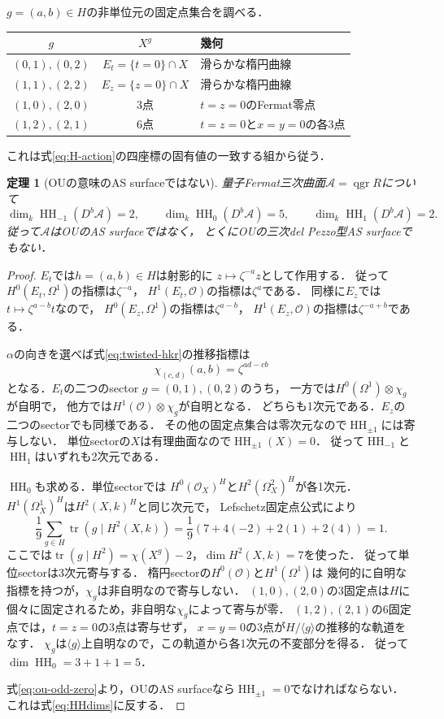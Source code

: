 \documentclass[11pt,a4paper]{ltjsarticle}
\newtheorem{theorem}{定理}[section]
\theoremstyle{definition}
\newcommand{\qgr}{\operatorname{qgr}}
\newcommand{\HH}{\operatorname{HH}}
\newcommand{\tr}{\operatorname{tr}}
\begin{document}
$g=(a,b)\in H$の非単位元の固定点集合を調べる．
\begin{center}\small
\begin{tabular}{ccl}
\toprule
$g$&$X^g$&幾何\\\midrule
$(0,1),(0,2)$&$E_t=\{t=0\}\cap X$&滑らかな楕円曲線\\
$(1,1),(2,2)$&$E_z=\{z=0\}\cap X$&滑らかな楕円曲線\\
$(1,0),(2,0)$&3点&$t=z=0$のFermat零点\\
$(1,2),(2,1)$&6点&$t=z=0$と$x=y=0$の各3点\\\bottomrule
\end{tabular}
\end{center}
これは式\eqref{eq:H-action}の四座標の固有値の一致する組から従う．

\begin{theorem}[OUの意味のAS surfaceではない]
\label{thm:not-OU-AS}
量子Fermat三次曲面$\mathcal A=\qgr R$について
\begin{equation}\label{eq:HHdims}
 \boxed{\dim_k\HH_{-1}(D^b\mathcal A)=2,\qquad
 \dim_k\HH_0(D^b\mathcal A)=5,\qquad
 \dim_k\HH_1(D^b\mathcal A)=2.}
\end{equation}
従って$\mathcal A$はOU\cite[Definition~1.1]{OU}のAS surfaceではなく，
とくにOUの三次del Pezzo型AS surfaceでもない．
\end{theorem}
\begin{proof}
$E_t$では$h=(a,b)\in H$は射影的に
$z\mapsto\zeta^{-a}z$として作用する．
従って$H^0(E_t,\Omega^1)$の指標は$\zeta^{-a}$，
$H^1(E_t,\mathcal O)$の指標は$\zeta^a$である．
同様に$E_z$では$t\mapsto\zeta^{a-b}t$なので，
$H^0(E_z,\Omega^1)$の指標は$\zeta^{a-b}$，
$H^1(E_z,\mathcal O)$の指標は$\zeta^{-a+b}$である．

$\alpha$の向きを選べば式\eqref{eq:twisted-hkr}の推移指標は
\[
 \chi_{(c,d)}(a,b)=\zeta^{ad-cb}
\]
となる．$E_t$の二つのsector $g=(0,1),(0,2)$のうち，
一方では$H^0(\Omega^1)\otimes\chi_g$が自明で，
他方では$H^1(\mathcal O)\otimes\chi_g$が自明となる．
どちらも1次元である．$E_z$の二つのsectorでも同様である．
その他の固定点集合は零次元なので$\HH_{\pm1}$には寄与しない．
単位sectorの$X$は有理曲面なので$\HH_{\pm1}(X)=0$．
従って$\HH_{-1}$と$\HH_1$はいずれも2次元である．

$\HH_0$も求める．単位sectorでは
$H^0(\mathcal O_X)^H$と$H^2(\Omega_X^2)^H$が各1次元．
$H^1(\Omega_X^1)^H$は$H^2(X,k)^H$と同じ次元で，
Lefschetz固定点公式により
\[
 \frac19\sum_{g\in H}\tr(g\mid H^2(X,k))
 =\frac19\left(7+4(-2)+2(1)+2(4)\right)=1.
\]
ここでは$\tr(g\mid H^2)=\chi(X^g)-2$，$\dim H^2(X,k)=7$を使った．
従って単位sectorは3次元寄与する．
楕円sectorの$H^0(\mathcal O)$と$H^1(\Omega^1)$は
幾何的に自明な指標を持つが，$\chi_g$は非自明なので寄与しない．
$(1,0),(2,0)$の3固定点は$H$に個々に固定されるため，非自明な$\chi_g$によって寄与が零．
$(1,2),(2,1)$の6固定点では，$t=z=0$の3点は寄与せず，
$x=y=0$の3点が$H/\langle g\rangle$の推移的な軌道をなす．
$\chi_g$は$\langle g\rangle$上自明なので，この軌道から各1次元の不変部分を得る．
従って$\dim\HH_0=3+1+1=5$．

式\eqref{eq:ou-odd-zero}より，OUのAS surfaceなら$\HH_{\pm1}=0$でなければならない．
これは式\eqref{eq:HHdims}に反する．
\end{proof}
\end{document}
